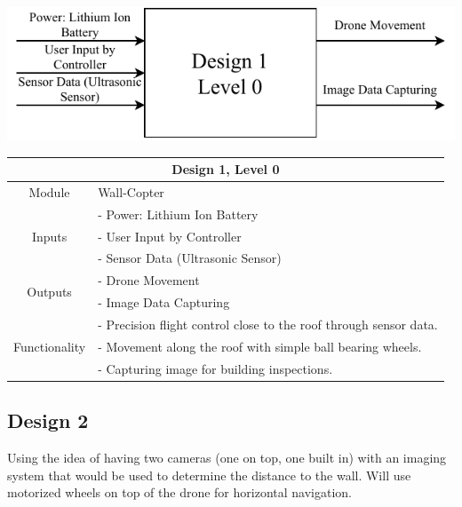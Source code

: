\documentclass[12pt]{article}
\begin{document}
            \vspace{0.5in}
            \centerline{\includegraphics{./resources/assignment3-Design1.schematic.drawio.pdf}}

            \vspace{0.5in}
            \begin{tabular}{|c|l|}
                \hline
                \multicolumn{2}{|c|}{\textbf{Design 1, Level 0}} \\\hline
                Module & Wall-Copter \\\hline
                \multirow{3}{3cm}{Inputs}
                    & - Power: Lithium Ion Battery\\
                    & - User Input by Controller \\
                    & - Sensor Data (Ultrasonic Sensor) \\
                    \hline
                \multirow{2}{3cm}{Outputs}
                    & - Drone Movement \\
                    & - Image Data Capturing \\
                    \hline
                \multirow{3}{3cm}{Functionality}
                    & - Precision flight control close to the roof through sensor data. \\
                    & - Movement along the roof with simple ball bearing wheels. \\
                    & - Capturing image for building inspections. \\
                    \hline
                
            \end{tabular}
            
        \newpage
        \subsection{Design 2}
            Using the idea of having two cameras (one on top, one built in) with an imaging system that would be used to determine the distance to the wall. Will use motorized wheels on top of the drone for horizontal navigation.
            
\end{document}
